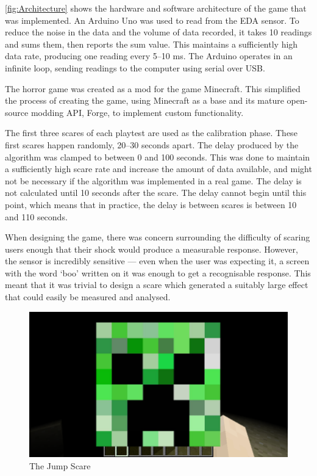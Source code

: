 \documentclass[12pt,a4paper]{article}\usepackage[]{graphicx}\usepackage[]{color}
\begin{document}
\vref{fig:Architecture} shows the hardware and software architecture of the game that was implemented.
An Arduino Uno was used to read from the EDA sensor.
To reduce the noise in the data and the volume of data recorded, it takes 10 readings and sums them, then reports the sum value.
This maintains a sufficiently high data rate, producing one reading every 5--10 ms.
The Arduino operates in an infinite loop, sending readings to the computer using serial over USB.

The horror game was created as a mod for the game Minecraft.
This simplified the process of creating the game, using Minecraft as a base and its mature open-source modding API, Forge, to implement custom functionality.

The first three scares of each playtest are used as the calibration phase.
These first scares happen randomly, 20--30 seconds apart.
The delay produced by the algorithm was clamped to between 0 and 100 seconds.
This was done to maintain a sufficiently high scare rate and increase the amount of data available, and might not be necessary if the algorithm was implemented in a real game.
The delay is not calculated until 10 seconds after the scare.
The delay cannot begin until this point, which means that in practice, the delay is between scares is between 10 and 110 seconds.

When designing the game, there was concern surrounding the difficulty of scaring users enough that their shock would produce a measurable response.
However, the sensor is incredibly sensitive --- even when the user was expecting it, a screen with the word `boo' written on it was enough to get a recognisable response.
This meant that it was trivial to design a scare which generated a suitably large effect that could easily be measured and analysed.

\begin{figure}
	\vspace{-10pt}
	\centering
	\includegraphics[width=\linewidth]{images/scare.png}
	\caption{The Jump Scare}
	\label{fig:JumpScare}
	\vspace{-15pt}
\end{figure}
\end{document}

